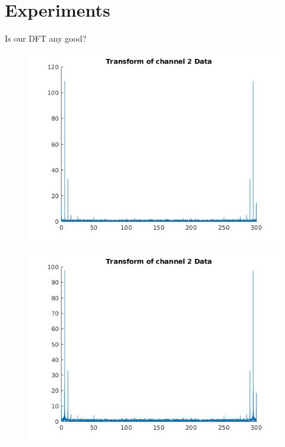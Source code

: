 \documentclass[10pt]{beamer}
\begin{document}
\section{Experiments}

\begin{frame}{Is our DFT any good?}
  \begin{figure}
    \begin{minipage}{0.4\textwidth}
      \centering
      \includegraphics[width=0.85\linewidth]{figures/my_dft.jpg}
      \label{fig:dft}
    \end{minipage}%
    \hfill
    \begin{minipage}{0.4\textwidth}
      \centering
      \includegraphics[width=0.85\linewidth]{figures/my_fft.jpg}
      \label{fig:fft}
    \end{minipage}
    

\end{figure}
\end{frame}
\end{document}
